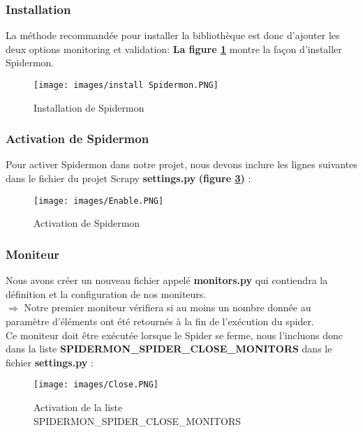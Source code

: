 \subsubsection{Installation}
La méthode recommandée pour installer la bibliothèque est donc d'ajouter les deux options monitoring et validation:
\textbf{La figure \ref{fig:Spidermon}} montre la façon d'installer Spidermon.
\begin{figure}[H]
            \centering
            \texttt{[image: images/install Spidermon.PNG]}
            \caption{Installation de Spidermon}
            \label{fig:Spidermon}  
        \end{figure}
\subsubsection{Activation de Spidermon}
Pour activer Spidermon dans notre projet, nous devons inclure les lignes suivantes dans le fichier du projet Scrapy \textbf{settings.py} \textbf{(figure \ref{fig:Activation Spidermon})} :
\begin{figure}[H]
            \centering
            \texttt{[image: images/Enable.PNG]}
            \caption{Activation de Spidermon}
            \label{fig:Activation Spidermon}  
        \end{figure}
\subsubsection{Moniteur}
Nous avons créer un nouveau fichier appelé \textbf{monitors.py} qui contiendra la définition et la configuration de nos moniteurs.\\

$\Rightarrow$ Notre premier moniteur vérifiera si au moins un nombre donnée au paramètre d'éléments ont été retournés à la fin de l'exécution du spider.\\
Ce moniteur doit être exécutée lorsque le Spider se ferme, nous l'incluons donc dans la liste \textbf{SPIDERMON\_SPIDER\_CLOSE\_MONITORS} dans le fichier \textbf{settings.py} :
\begin{figure}[H]
            \centering
            \texttt{[image: images/Close.PNG]}
            \caption{Activation de la liste SPIDERMON\_SPIDER\_CLOSE\_MONITORS}
            \label{fig:Activation Spidermon}  
        \end{figure}
        
